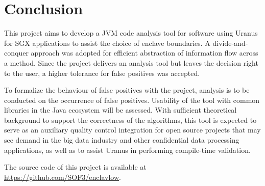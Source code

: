 \section{Conclusion}\label{sec:conclusion}
This project aims to develop a \ac{JVM} code analysis tool
for software using Uranus for \ac{SGX} applications
to assist the choice of enclave boundaries.
A divide-and-conquer approach was adopted for
efficient abstraction of information flow across a method.
Since the project delivers an analysis tool
but leaves the decision right to the user,
a higher tolerance for false positives was accepted.

To formalize the behaviour of false positives with the project,
analysis is to be conducted on the occurrence of false positives.
Usability of the tool with common libraries in the Java ecosystem will be assessed.
With sufficient theoretical background to support the correctness of the algorithms,
this tool is expected to serve as an auxiliary quality control integration
for open source projects that may see demand in the big data industry
and other confidential data processing applications,
as well as to assist Uranus in performing compile-time validation.

The source code of this project is available at
\url{https://github.com/SOF3/enclavlow}.
